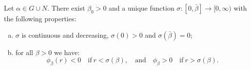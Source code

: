 \begin{lemma}\label{genlem4}
Let $\alpha \in G \cup N$. There exist $\beta_0 > 0$ and a unique function
$\sigma : [0, \bar\beta] \to [0, \infty)$ with the following properties:
\begin{enumerate}[(a)]
\item  $\sigma$ is continuous and decreasing, $\sigma(0) > 0$ and
$\sigma(\bar\beta) = 0$; 
\item for all $\beta > 0$ we have: 
\[
    \phi_\beta(r) < 0 \quad \text{if} ~ r < \sigma(\beta), 
    \quad \text{and} \quad
    \phi_\beta > 0 \quad \text{if} ~ r > \sigma(\beta). 
\]
\end{enumerate}
\end{lemma}

